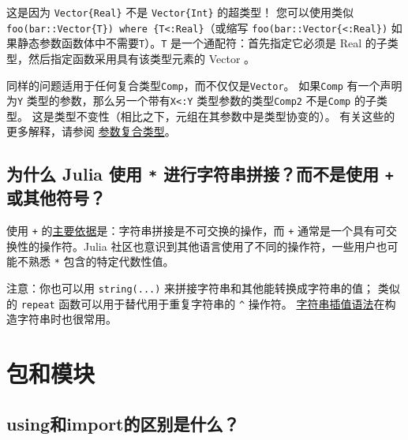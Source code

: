 这是因为 \texttt{Vector\{Real\}} 不是 \texttt{Vector\{Int\}} 的超类型！ 您可以使用类似 \texttt{foo(bar::Vector\{T\}) where \{T<:Real\}}（或缩写 \texttt{foo(bar::Vector\{<:Real\})} 如果静态参数函数体中不需要\texttt{T}）。\texttt{T} 是一个通配符：首先指定它必须是 Real 的子类型，然后指定函数采用具有该类型元素的 Vector 。



同样的问题适用于任何复合类型\texttt{Comp}，而不仅仅是\texttt{Vector}。 如果\texttt{Comp} 有一个声明为\texttt{Y} 类型的参数，那么另一个带有\texttt{X<:Y} 类型参数的类型\texttt{Comp2} 不是\texttt{Comp} 的子类型。 这是类型不变性（相比之下，元组在其参数中是类型协变的）。 有关这些的更多解释，请参阅 \hyperlink{17413469367194810249}{参数复合类型}。



\hypertarget{6739766638073943445}{}


\subsection{为什么 Julia 使用 \texttt{*} 进行字符串拼接？而不是使用 \texttt{+} 或其他符号？}



使用 \texttt{+}  的\hyperlink{12933998460683957945}{主要依据}是：字符串拼接是不可交换的操作，而 \texttt{+} 通常是一个具有可交换性的操作符。Julia 社区也意识到其他语言使用了不同的操作符，一些用户也可能不熟悉 \texttt{*} 包含的特定代数性值。



注意：你也可以用 \texttt{string(...)} 来拼接字符串和其他能转换成字符串的值； 类似的 \texttt{repeat} 函数可以用于替代用于重复字符串的 \texttt{{\textasciicircum}} 操作符。 \hyperlink{4452850363638134205}{字符串插值语法}在构造字符串时也很常用。



\hypertarget{16669380183019264286}{}


\section{包和模块}



\hypertarget{18070754917834956483}{}


\subsection{{\textquotedbl}using{\textquotedbl}和{\textquotedbl}import{\textquotedbl}的区别是什么？}



